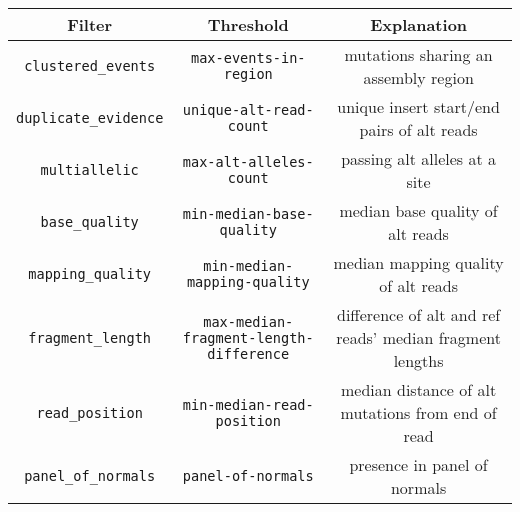 \documentclass[nofootinbib,amssymb,amsmath]{revtex4}
\newcommand{\code}[1]{\texttt{#1}}
\begin{document}
\begin{table}[h!]
\centering
 \begin{tabular}{|| c c c ||} 
 \hline
 Filter & Threshold & Explanation \\ [0.5ex] 
 \hline\hline
 \code{clustered\_events} & \code{max-events-in-region} & mutations sharing an assembly region \\
 \code{duplicate\_evidence} & \code{unique-alt-read-count} & unique insert start/end pairs of alt reads \\
 \code{multiallelic} & \code{max-alt-alleles-count} & passing alt alleles at a site \\
 \code{base\_quality} & \code{min-median-base-quality} & median base quality of alt reads \\
 \code{mapping\_quality} & \code{min-median-mapping-quality} & median mapping quality of alt reads \\
 \code{fragment\_length} & \code{max-median-fragment-length-difference} & difference of alt and ref reads' median fragment lengths \\
 \code{read\_position} &\code{min-median-read-position} & median distance of alt mutations from end of read \\
 \code{panel\_of\_normals} & \code{panel-of-normals}  & presence in panel of normals \\
 \hline
 \end{tabular}
\end{table}

\end{document}
